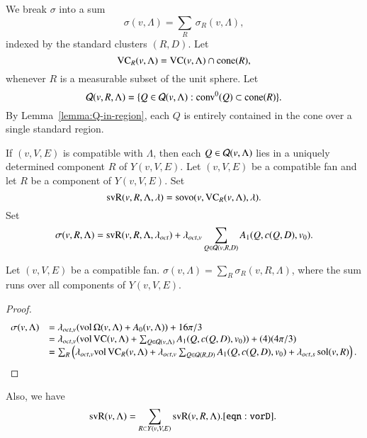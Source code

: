 
We break $\sigma$ into a sum
   \begin{equation}
   \sigma(v,\Lambda) = \sum_R\,\sigma_R(v,\Lambda),
   \end{equation}
indexed by the standard clusters $(R,D)$.  Let
   $$
   {\operatorname{VC}}_R(v,\Lambda) = {\operatorname{VC}}(v,\Lambda)\cap {\operatorname{cone}}(R),
   $$
whenever $R$ is a measurable subset of the unit sphere.  Let
   $$
   {\mathcal Q}(v,R,\Lambda) = \{Q\in {\mathcal Q}(v,\Lambda) : {\operatorname{conv}}^0(Q)\subset {\operatorname{cone}}(R)\}.
   $$
By Lemma~\ref{lemma:Q-in-region},
 each $Q$ is entirely contained in the cone over a single
standard region.

\begin{definition} 
If $(v,V,E)$ is compatible with $\Lambda$, then each $Q\in{\mathcal Q}(v,\Lambda)$
lies in a uniquely determined component $R$ of $Y(v,V,E)$.
Let $(v,V,E)$ be a compatible fan and let $R$ be a
component of $Y(v,V,E)$.  Set
      $$
      {\operatorname{svR}}(v,R,\Lambda,\lambda) =
      {\operatorname{sovo}}(v,{\operatorname{VC}}_R(v,\Lambda),\lambda).
      $$
Set
      $$
      \sigma(v,R,\Lambda) = {\operatorname{svR}}(v,R,\Lambda,\lambda_{oct}) 
      + \lambda_{oct,v}
         \sum_{Q\in{\mathcal Q}(v,R,D)} A_1(Q,c(Q,D),v_0).
      $$
 
\end{definition}

\begin{lemma} 
Let $(v,V,E)$ be a compatible fan.
$\sigma(v,\Lambda) = \sum_R\sigma_R(v,R,\Lambda)$, where the sum runs
over all components of $Y(v,V,E)$.
\end{lemma}

\begin{proof}
   $$
   \begin{array}{lll}
      \sigma(v,\Lambda)
      &= \lambda_{oct,v} ({\operatorname{vol}}\,\Omega(v,\Lambda) + A_0(v,\Lambda))+16\pi/3\\
      &= \lambda_{oct,v} ({\operatorname{vol}}\,{\operatorname{VC}}(v,\Lambda)+\sum_{Q\in{\mathcal Q}(v,\Lambda)}
         A_1(Q,c(Q,D),v_0)) + (4) (4\pi/3)\\
      &= \sum_R \left (\lambda_{oct,v} {\operatorname{vol}}\,{\operatorname{VC}}_R(v,\Lambda) 
         +\lambda_{oct,v}
         \sum_{Q\in{\mathcal Q}(R,D)} A_1(Q,c(Q,D),v_0) +
         \lambda_{oct,s}\operatorname{sol}(v,R)\right).
   \end{array}
   $$
\end{proof}

Also, we have
    \begin{equation}
    \op{svR}(v,\Lambda)=\sum_{R\subset Y(v,V,E)}
    \op{svR}(v,R,\Lambda).
    \tlabel{eqn:vorD}
    \end{equation}


